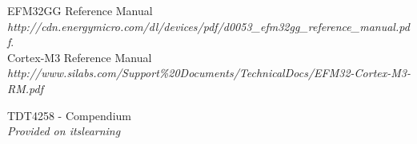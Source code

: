 
\begin{thebibliography}{9}

  EFM32GG Reference Manual\\
  \emph{http://cdn.energymicro.com/dl/devices/pdf/d0053\_efm32gg\_reference\_manual.pdf}.\\

 Cortex-M3 Reference Manual\\
	\emph{http://www.silabs.com/Support\%20Documents/TechnicalDocs/EFM32-Cortex-M3-RM.pdf}

 TDT4258 - Compendium\\
	\emph{Provided on itslearning}

\end{thebibliography}